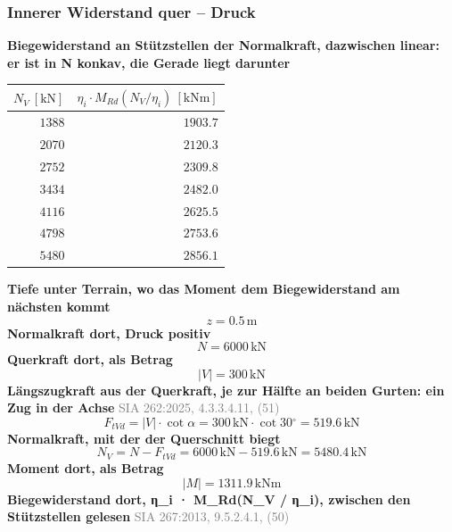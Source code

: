 \documentclass[11pt,a4paper]{article}
\newcommand{\normref}[1]{{\small\textcolor{gray}{#1}}}
\begin{document}
\subsubsection{Innerer Widerstand quer – Druck}
\noindent\textbf{Biegewiderstand an Stützstellen der Normalkraft, dazwischen linear: er ist in N konkav, die Gerade liegt darunter}
\begin{longtable}{rr}
\hline
$N_V\ [\mathrm{kN}]$ & $\eta_i \cdot M_{Rd}(N_V / \eta_i)\ [\mathrm{kNm}]$ \\
\hline
\endhead
$1388$ & $1903.7$ \\
$2070$ & $2120.3$ \\
$2752$ & $2309.8$ \\
$3434$ & $2482.0$ \\
$4116$ & $2625.5$ \\
$4798$ & $2753.6$ \\
$5480$ & $2856.1$ \\
\hline
\end{longtable}
\noindent\textbf{Tiefe unter Terrain, wo das Moment dem Biegewiderstand am nächsten kommt}
\begin{equation*}
z = 0.5\,\mathrm{m}
\end{equation*}
\noindent\textbf{Normalkraft dort, Druck positiv}
\begin{equation*}
N = 6000\,\mathrm{kN}
\end{equation*}
\noindent\textbf{Querkraft dort, als Betrag}
\begin{equation*}
\left|V\right| = 300\,\mathrm{kN}
\end{equation*}
\noindent\textbf{Längszugkraft aus der Querkraft, je zur Hälfte an beiden Gurten: ein Zug in der Achse} \hfill \normref{SIA 262:2025, 4.3.3.4.11, (51)}
\begin{equation*}
F_{tVd} = \left|V\right| \cdot \cot \alpha = 300\,\mathrm{kN} \cdot \cot 30{}^{\circ} = 519.6\,\mathrm{kN}
\end{equation*}
\noindent\textbf{Normalkraft, mit der der Querschnitt biegt}
\begin{equation*}
N_V = N - F_{tVd} = 6000\,\mathrm{kN} - 519.6\,\mathrm{kN} = 5480.4\,\mathrm{kN}
\end{equation*}
\noindent\textbf{Moment dort, als Betrag}
\begin{equation*}
\left|M\right| = 1311.9\,\mathrm{kNm}
\end{equation*}
\noindent\textbf{Biegewiderstand dort, η\_i · M\_Rd(N\_V / η\_i), zwischen den Stützstellen gelesen} \hfill \normref{SIA 267:2013, 9.5.2.4.1, (50)}
\end{document}
